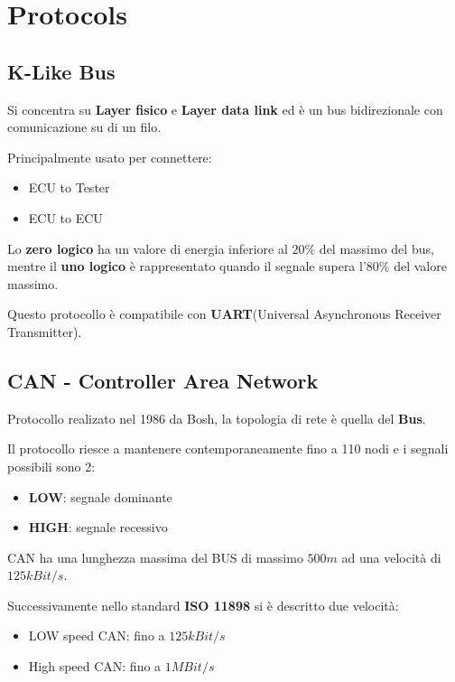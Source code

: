 \section{Protocols}


\subsection{K-Like Bus}

Si concentra su \textbf{Layer fisico} e \textbf{Layer data link} ed è un bus bidirezionale con comunicazione su di un filo.


Principalmente usato per connettere:
\begin{itemize}
  \item ECU to Tester
  \item ECU to ECU
\end{itemize}

Lo \textbf{zero logico} ha un valore di energia inferiore al $20\%$ del massimo del bus, mentre il \textbf{uno logico} è rappresentato quando il segnale supera l'$80\%$ del valore massimo.

Questo protocollo è compatibile con \textbf{UART}(Universal Asynchronous Receiver Transmitter).






\subsection{CAN - Controller Area Network}

Protocollo realizato nel 1986 da Bosh, la topologia di rete è quella del \textbf{Bus}.

Il protocollo riesce a mantenere contemporaneamente fino a 110 nodi e i segnali possibili sono 2:
\begin{itemize}
  \item \textbf{LOW}: segnale dominante
  \item \textbf{HIGH}: segnale recessivo
\end{itemize}


CAN ha una lunghezza massima del BUS di massimo $500m$ ad una velocità di $125kBit/s$.


Successivamente nello standard \textbf{ISO 11898} si è descritto due velocità:
\begin{itemize}
  \item LOW speed CAN: fino a $125kBit/s$
  \item High speed CAN: fino a $1MBit/s$
\end{itemize}

